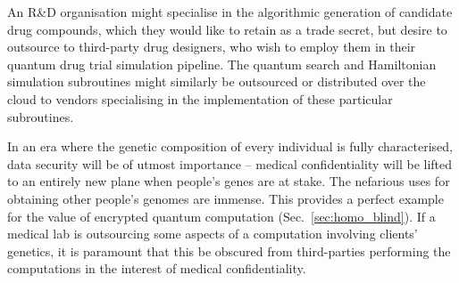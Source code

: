 An R\&D organisation might specialise in the algorithmic generation of candidate drug compounds, which they would like to retain as a trade secret, but desire to outsource to third-party drug designers, who wish to employ them in their quantum drug trial simulation pipeline. The quantum search and Hamiltonian simulation subroutines might similarly be outsourced or distributed over the cloud to vendors specialising in the implementation of these particular subroutines.

In an era where the genetic composition of every individual is fully characterised, data security will be of utmost importance -- medical confidentiality will be lifted to an entirely new plane when people's genes are at stake. The nefarious uses for obtaining other people's genomes are immense. This provides a perfect example for the value of encrypted quantum computation (Sec.~\ref{sec:homo_blind}). If a medical lab is outsourcing some aspects of a computation involving clients' genetics, it is paramount that this be obscured from third-parties performing the computations in the interest of medical confidentiality. 